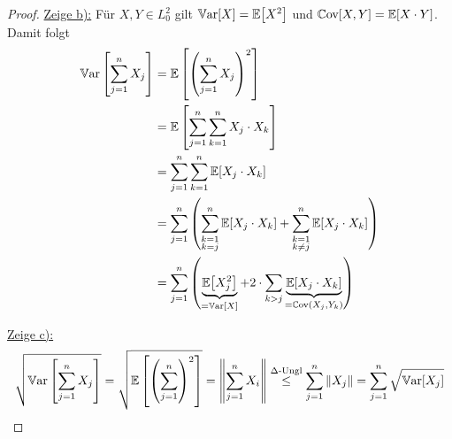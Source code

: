\documentclass[12pt,a4paper]{article}
\begin{document}
\begin{proof}
\underline{Zeige b):} Für $X,Y\in L_0^2$ gilt $\mathbb{V}\text{ar}[X]=\mathbb{E}\big[X^2\big]$ und $\mathbb{C}\text{ov}[X,Y]=\mathbb{E}[X\cdot Y]$. Damit folgt
\begin{align*}
\mathbb{V}\text{ar}\left[\sum\limits_{j=1}^n X_j\right]
&=\mathbb{E}\left[\left(\sum\limits_{j=1}^n X_j\right)^2\right]\\
&=\mathbb{E}\left[\sum\limits_{j=1}^n\sum\limits_{k=1}^n X_j\cdot X_k\right]\\
&=\sum\limits_{j=1}^n\sum\limits_{k=1}^n \mathbb{E}[X_j\cdot X_k]\\
&=\sum\limits_{j=1}^n\left(
\sum\limits_{\begin{subarray}{c}k=1\\ k=j\end{subarray}}^n \mathbb{E}[X_j\cdot X_k]
+\sum\limits_{\begin{subarray}{c}k=1\\ k\neq j\end{subarray}}^n \mathbb{E}[X_j\cdot X_k]\right)\\
&=\sum\limits_{j=1}^n\left(\underbrace{\mathbb{E}\big[X_j^2\big]}_{=\mathbb{V}\text{ar}[X]}+2\cdot\sum\limits_{k>j}\underbrace{\mathbb{E}[X_j\cdot X_k]}_{=\mathbb{C}\text{ov}(X_j,Y_k)}\right)
\end{align*}

\underline{Zeige c):}\\
\begin{align*}
\sqrt{\mathbb{V}\text{ar}\left[\sum\limits_{j=1}^n X_j\right]}
=\sqrt{\mathbb{E}\left[\left(\sum\limits_{j=1}^n\right)^2\right]}
=\left\Vert\sum\limits_{j=1}^n X_i\right\Vert
\stackrel{\Delta\text{-Ungl}}{\leq}
\sum\limits_{j=1}^n\Vert X_j\Vert
=\sum\limits_{j=1}^n\sqrt{\mathbb{V}\text{ar}[X_j]}
\end{align*}
\end{proof}
\end{document}
